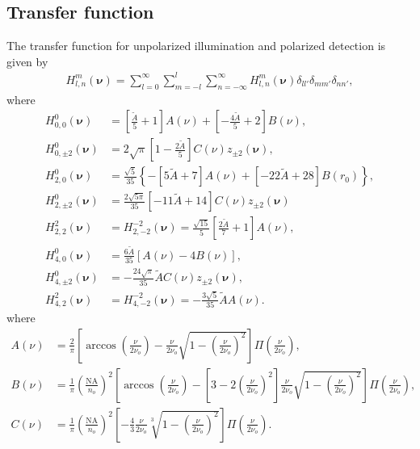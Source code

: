 \documentclass[11pt]{article}
\providecommand{\bs}[1]{\boldsymbol{#1}}
\begin{document}
\subsection{Transfer function}
The transfer function for unpolarized illumination and polarized detection is
given by
\begin{align}
  H_{l,n}^m(\bs{\nu}) = \sum_{l=0}^{\infty}\sum_{m=-l}^l\sum_{n=-\infty}^{\infty} H_{l,n}^m(\bs{\nu})\delta_{ll'}\delta_{mm'}\delta_{nn'},
\end{align}
where
\begin{align}
  H_{0,0}^0(\bs{\nu}) &= \left[\frac{\tilde{A}}{5} + 1\right]A(\nu) + \left[-\frac{4\tilde{A}}{5} + 2\right]B(\nu),\\ 
  H_{0,\pm 2}^0(\bs{\nu}) &= 2\sqrt{\pi}\left[1 - \frac{2\tilde{A}}{5}\right]C(\nu)z_{\pm 2}(\bs{\nu}),\\ 
  H_{2,0}^0(\bs{\nu}) &= \frac{\sqrt{5}}{35}\left\{-\left[5\tilde{A} + 7\right]A(\nu) + \left[-22\tilde{A} + 28\right]B(r_0)\right\},\\ 
  H_{2,\pm 2}^0(\bs{\nu}) &= \frac{2\sqrt{5\pi}}{35}\left[-11\tilde{A} + 14\right]C(\nu)z_{\pm 2}(\bs{\nu})\\ 
  H_{2,2}^{2}(\bs{\nu}) &= H_{2,-2}^{-2}(\bs{\nu}) = \frac{\sqrt{15}}{5}\left[\frac{2\tilde{A}}{7} + 1\right]A(\nu),\\ 
  H_{4,0}^0(\bs{\nu}) &= \frac{6\tilde{A}}{35}\left[A(\nu) - 4B(\nu)\right],\\ 
  H_{4,\pm 2}^0(\bs{\nu}) &= -\frac{24\sqrt{\pi}}{35}\tilde{A}C(\nu)z_{\pm 2}(\bs{\nu}),\\ 
  H_{4,2}^{2}(\bs{\nu}) &= H_{4,-2}^{-2}(\bs{\nu}) = -\frac{3\sqrt{5}}{35}\tilde{A}A(\nu). 
\end{align}
where 
\begin{align}
  A(\nu) &= \frac{2}{\pi}\left[\arccos\left(\frac{\nu}{2\nu_o}\right) - \frac{\nu}{2\nu_o}\sqrt{1 - \left(\frac{\nu}{2\nu_o}\right)^2}\right]\Pi\left(\frac{\nu}{2\nu_o}\right),\\
  B(\nu) &= \frac{1}{\pi}\left(\frac{\text{NA}}{n_o}\right)^2\left[\arccos\left(\frac{\nu}{2\nu_o}\right) - \left[3 - 2\left(\frac{\nu}{2\nu_o}\right)^2\right]\frac{\nu}{2\nu_o} \sqrt{1 - \left(\frac{\nu}{2\nu_o}\right)^2}\right]\Pi\left(\frac{\nu}{2\nu_o}\right),\\
  C(\nu) &= \frac{1}{\pi}\left(\frac{\text{NA}}{n_o}\right)^2\left[-\frac{4}{3}\frac{\nu}{2\nu_o}\sqrt[3]{1 - \left(\frac{\nu}{2\nu_o}\right)^2}\right]\Pi\left(\frac{\nu}{2\nu_o}\right).
\end{align}
\end{document}
